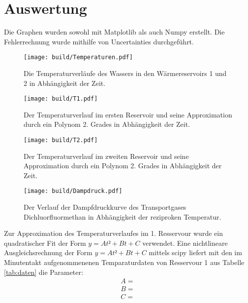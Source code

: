 \section{Auswertung}
\label{sec:Auswertung}
Die Graphen wurden sowohl mit Matplotlib\cite{matplotlib} als auch Numpy\cite{numpy} erstellt. Die
 Fehlerrechnung wurde mithilfe von Uncertainties\cite{uncertainties} durchgeführt.
 \begin{figure}
 	\centering
 	\caption{Die Temperaturverläufe des Wassers in den Wärmereservoirs 1 und 2 in Abhängigkeit der Zeit.}
 	\texttt{[image: build/Temperaturen.pdf]}
 	\label{fig:Graph1}
 \end{figure}
 \begin{figure}
 	\centering
 	\caption{Der Temperaturverlauf im ersten Reservoir und seine Approximation durch ein Polynom 2. Grades in Abhängigkeit der Zeit.}
 	\texttt{[image: build/T1.pdf]}
 	\label{fig:Graph1}
 \end{figure}
 \begin{figure}
 	\centering
 	\caption{Der Temperaturverlauf im zweiten Reservoir und seine Approximation durch ein Polynom 2. Grades in Abhängigkeit der Zeit.}
 	\texttt{[image: build/T2.pdf]}
 	\label{fig:Graph1}
 \end{figure}
 \begin{figure}
 	\centering
 	\caption{Der Verlauf der Dampfdruckkurve des Transportgases Dichluorfluormethan in Abhängigkeit der reziproken Temperatur.}
 	\texttt{[image: build/Dampdruck.pdf]}
 	\label{fig:Graph1}
 \end{figure}




 Zur Approximation des Temperaturverlaufes im 1. Resservour wurde ein
 quadratischer Fit der Form $y = At²+Bt+C$ verwendet. Eine nichtlineare
 Ausgleichsrechnung der Form $y = At²+Bt+C$ mittels scipy\cite{scipy} liefert mit den im Minutentakt
 aufgenommenenen Temparaturdaten von Resservour 1 aus Tabelle \ref{tab:daten}
 die Parameter:
 \begin{displaymath}
\begin{aligned}
 A = \\
 B = \\
 C =
 \end{aligned}
 \end{displaymath}

